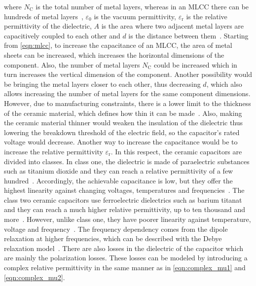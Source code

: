 where $N_{\mathrm{C}}$ is the total number of metal layers, whereas in an MLCC there can be hundreds of metal layers~\cite{8094717}, $\varepsilon_0$ is the vacuum permittivity, $\varepsilon_\mathrm{r}$ is the relative permittivity of the dielectric, $A$ is the area where two adjacent metal layers are capacitively coupled to each other and $d$ is the distance between them~\cite{5482787}. Starting from \eqref{eqn:mlcc}, to increase the capacitance of an MLCC, the area of metal sheets can be increased, which increases the horizontal dimensions of the component. Also, the number of metal layers $N_{\mathrm{C}}$ could be increased which in turn increases the vertical dimension of the component. Another possibility would be bringing the metal layers closer to each other, thus decreasing $d$, which also allows increasing the number of metal layers for the same component dimensions. However, due to manufacturing constraints, there is a lower limit to the thickness of the ceramic material, which defines how thin it can be made~\cite{5482787}. Also, making the ceramic material thinner would weaken the insulation of the dielectric thus lowering the breakdown threshold of the electric field, so the capacitor's rated voltage would decrease. Another way to increase the capacitance would be to increase the relative permittivity $\varepsilon_{\mathrm{r}}$. In this respect, the ceramic capacitors are divided into classes. In class one, the dielectric is made of paraelectric substances such as titanium dioxide  and they can reach a relative permittivity of a few hundred~\cite{5482787}. Accordingly, the achievable capacitance is low, but they offer the highest linearity against changing voltages, temperatures and frequencies~\cite{5482787}. The class two ceramic capacitors use ferroelectric dielectrics such as barium titanat  and they can reach a much higher relative permittivity, up to ten thousand and more~\cite{5482787}. However, unlike class one, they have poorer linearity against temperature, voltage and frequency~\cite{5482787}. The frequency dependency comes from the dipole relaxation at higher frequencies, which can be described with the Debye relaxation model~\cite{werkstoffe}. There are also losses in the dielectric of the capacitor which are mainly the polarization losses. These losses can be modeled by introducing a complex relative permittivity in the same manner as in \eqref{eqn:complex_mu1} and \eqref{eqn:complex_mu2}.

